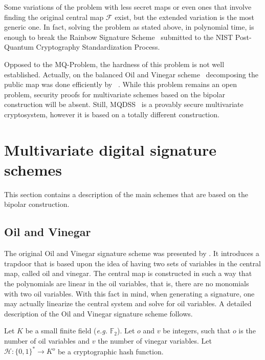 \documentclass{ufsctex/ufsctex}
\begin{document}
Some variations of the problem with less secret maps or even ones that involve
finding the original central map $\mathcal{F}$ exist, but the extended
variation is the most generic one. In fact, solving the problem as stated
above, in polynomial time, is enough to break the Rainbow Signature
Scheme~\cite{ding2005rainbow} submitted to the NIST Post-Quantum Cryptography
Standardization Process.

Opposed to the MQ-Problem, the hardness of this problem is not well
established. Actually, on the balanced Oil and Vinegar
scheme~\cite{patarin1997ov} decomposing the public map was done efficiently by
~\cite{kipnis1998cryptanalysis}. While this problem remains an open problem,
security proofs for multivariate schemes based on the bipolar construction will
be absent. Still, MQDSS~\cite{chen20165} is a provably secure multivariate cryptosystem,
however it is based on a totally different construction.

\section{Multivariate digital signature schemes}\label{sec:mqschemes}

This section contains a description of the main schemes that are based on the
bipolar construction.

\subsection{Oil and Vinegar}\label{sec:ov}

The original Oil and Vinegar signature scheme was presented by
\cite{patarin1997ov}. It introduces a trapdoor that is based upon the idea of
having two sets of variables in the central map, called oil and vinegar. The
central map is constructed in such a way that the polynomials are linear in the
oil variables, that is, there are no monomials with two oil variables. With
this fact in mind, when generating a signature, one may actually linearize the
central system and solve for oil variables. A detailed description of the Oil
and Vinegar signature scheme follows.

Let $K$ be a small finite field (\textit{e.g.} $\mathbb{F}_2$). Let $o$ and $v$
be integers, such that $o$ is the number of oil variables and $v$ the number of
vinegar variables. Let $\mathcal{H}: \{0,1\}^* \to K^o$ be a cryptographic hash
function.
\end{document}
